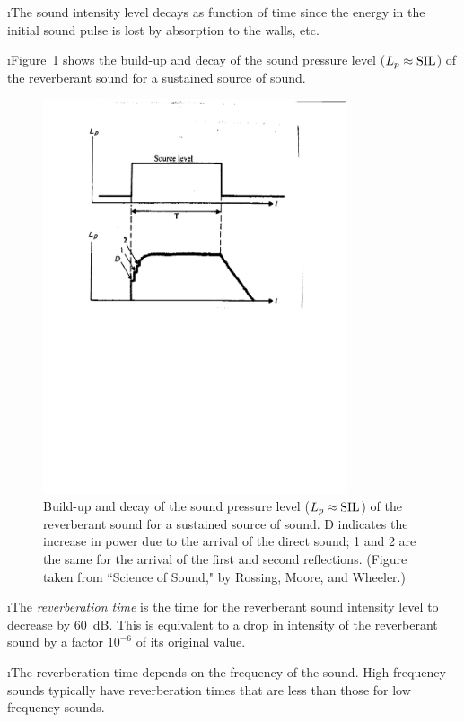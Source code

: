 \i The sound intensity level decays as function of time
since the energy in the initial sound pulse is lost by
absorption to the walls, etc.

\i Figure~\ref{f:reverb_time2} shows the build-up and
decay of the sound pressure level ($L_p\approx {\rm SIL}$)
of the reverberant sound for a sustained source of sound.
%
\begin{figure}[htbp]
\begin{center}
\includegraphics[width=0.8\textwidth]{reverb_time2}
\caption{
Build-up and decay of the sound pressure level 
($L_p\approx{\rm SIL}$) of the
reverberant sound for a sustained source of sound.
D indicates the increase in power due to the arrival
of the direct sound; 1 and 2 are the same for the 
arrival of the first and second reflections.
(Figure taken from  
``Science of Sound," by Rossing, Moore, and Wheeler.)}
\label{f:reverb_time2}
\end{center}
\end{figure}
%

\i The {\em reverberation time} is the time for the 
reverberant sound intensity level to decrease by 60~dB.
This is equivalent to a drop in intensity of the 
reverberant sound by a factor $10^{-6}$ of its 
original value.

\i The reverberation time depends on the frequency 
of the sound.
High frequency sounds typically have 
reverberation times that are less than those for
low frequency sounds.

